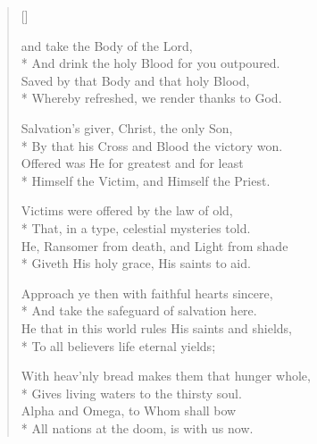 \newHymn


\begin{verse}[\versewidth]

 and take the Body of the Lord,\\*
And drink the holy Blood for you outpoured.\\
Saved by that Body and that holy Blood,\\*
Whereby refreshed, we render thanks to God.

Salvation's giver, Christ, the only Son,\\*
By that his Cross and Blood the victory won.\\
Offered was He for greatest and for least\\*
Himself the Victim, and Himself the Priest.

Victims were offered by the law of old,\\*
That, in a type, celestial mysteries told.\\
He, Ransomer from death, and Light from shade\\*
Giveth His holy grace, His saints to aid.

Approach ye then with faithful hearts sincere,\\*
And take the safeguard of salvation here.\\
He that in this world rules His saints and shields,\\*
To all believers life eternal yields;

With heav'nly bread makes them that hunger whole,\\*
Gives living waters to the thirsty soul.\\
Alpha and Omega, to Whom shall bow\\*
All nations at the doom, is with us now.

\end{verse}

\Hmeter{}

